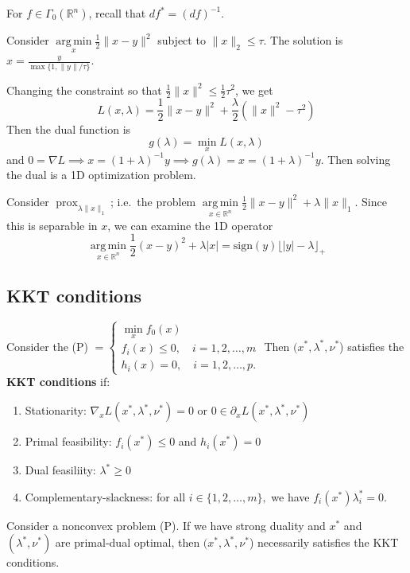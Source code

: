 \documentclass[english, 11pt]{article}
\DeclareMathOperator*{\argmin}{arg\,min}
\DeclareMathOperator*{\prox}{prox}
\begin{document}
\begin{rem}
For $f \in \Gamma_0(\mathbb{R}^n)$, recall that $d f^* = (df)^{-1}$.
\end{rem}


\begin{exmp}
Consider $\argmin \limits_x \frac{1}{2} \|x-y\|^2$ subject to $\|x\|_2 \le \tau$. The solution is $x = \frac{y}{\max\{1, \|y\|/\tau\}}$.

Changing the constraint so that $\frac{1}{2} \|x\|^2 \le \frac{1}{2} \tau^2$, we get
\[
L(x,\lambda) = \frac{1}{2} \|x-y\|^2 + \frac{\lambda}{2}(\|x\|^2- \tau^2)
\]
Then the dual function is
\[
g(\lambda)  = \min \limits_x L(x,\lambda) 
\]
and $0 = \nabla L \implies x = (1+ \lambda)^{-1} y \implies g(\lambda) = x = (1+\lambda)^{-1} y$. Then solving the dual is a 1D optimization problem.
\end{exmp}

\begin{exmp}
Consider $\prox_{\lambda \|x\|_1}$; i.e.\ the problem $\argmin \limits_{x \in \mathbb{R}^n} \frac{1}{2} \|x-y\|^2 + \lambda \|x\|_1$. Since this is separable in $x$, we can examine the 1D operator
\[
\argmin \limits_{x \in \mathbb{R}^n} \frac{1}{2}(x-y)^2 + \lambda|x| = \text{sign}(y) \lfloor |y|-\lambda \rfloor_+
\]
\end{exmp}
  
  \subsection{KKT conditions}
  Consider the (P) $=\begin{cases} 
  \min \limits_x f_0(x) \\
  f_i(x) \le 0, \quad i=1,2,\dots,m \\
  h_i(x)=0, \quad i=1,2,\dots,p.
  \end{cases}$ Then $(x^*,\lambda^*,\nu^*$) satisfies the {\bf KKT conditions} if:
  \begin{enumerate}
  \item Stationarity: $\nabla_x L(x^*,\lambda^*,\nu^*)=0$ or $0 \in \partial_x L(x^*,\lambda^*,\nu^*)$
  \item Primal feasibility: $f_i(x^*) \le 0$ and $h_i(x^*)=0$
  \item Dual feasiliity: $\lambda^* \ge 0$
  \item Complementary-slackness: for all $i \in \{1,2,\dots,m\},$ we have $f_i(x^*) \lambda_i^* =0$.
  \end{enumerate}
  
  
  \begin{thrm}
  Consider a nonconvex problem (P). If we have strong duality and $x^*$ and $(\lambda^*,\nu^*)$ are primal-dual optimal, then $(x^*,\lambda^*,\nu^*$) necessarily satisfies the KKT conditions. 
  \end{thrm}
  
\end{document}
